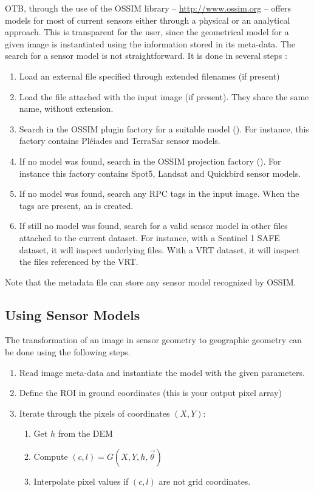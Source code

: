 OTB, through the use of the OSSIM library --
\url{http://www.ossim.org} -- offers models for most of current
sensors either through a physical or an analytical approach. This is
transparent for the user, since the geometrical model for a given
image is instantiated using the information stored in its meta-data. The 
search for a sensor model is not straightforward. It is done in several steps :
\begin{enumerate}
  \item Load an external  file specified through extended filenames
(if present)
  \item Load the  file attached with the input image (if present).
They share the same name, without extension.
  \item Search in the OSSIM plugin factory for a suitable model 
(). For instance, this
factory contains Pl\'eiades and TerraSar sensor models.
  \item If no model was found, search in the OSSIM projection factory 
(). For instance this factory contains
Spot5, Landsat and Quickbird sensor models.
  \item If no model was found, search any RPC tags in the input image. When the
tags are present, an  is created.
  \item If still no model was found, search for a valid sensor model in other
files attached to the current dataset. For instance, with a Sentinel 1 SAFE
dataset, it will inspect underlying  files. With a VRT dataset, it
will inspect the files referenced by the VRT.
\end{enumerate}

Note that the  metadata file can store any sensor model recognized
by OSSIM.

\subsection{Using Sensor Models}
\label{sec:UsingSensorModels}

The transformation of an image in sensor geometry to geographic
geometry can be done using the following steps.
  \begin{enumerate}
    \item Read image meta-data and instantiate the model with the
    given parameters.
  \item Define the ROI in ground coordinates (this is your output
  pixel array)
  \item Iterate through the pixels of coordinates $(X,Y)$:
    \begin{enumerate}
      \item Get $h$ from the DEM
      \item Compute $(c,l) = G(X,Y,h,\vec\theta)$
      \item Interpolate pixel values if $(c,l)$ are not grid coordinates.
    \end{enumerate}
  \end{enumerate}

